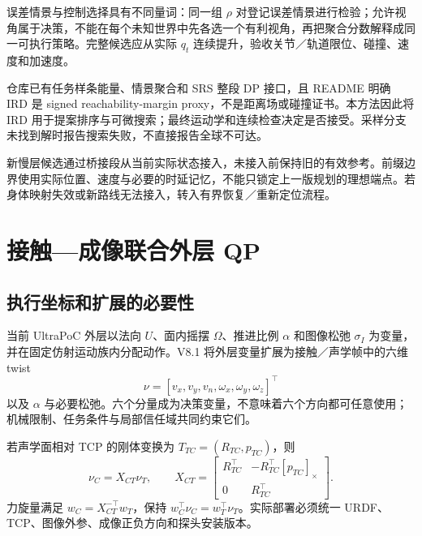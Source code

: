 \documentclass[UTF8,11pt,a4paper,fontset=fandol]{ctexart}
\numberwithin{equation}{section}
\theoremstyle{definition}
\newcommand{\sk}[1]{[#1]_{\times}}
\begin{document}
误差情景与控制选择具有不同量词：同一组 $\rho$ 对登记误差情景进行检验；允许视角属于决策，不能在每个未知世界中先各选一个有利视角，再把聚合分数解释成同一可执行策略。完整候选应从实际 $q_t$ 连续提升，验收关节／轨道限位、碰撞、速度和加速度。

仓库已有任务样条能量、情景聚合和 SRS 整段 DP 接口，且 README 明确 IRD 是 signed reachability-margin proxy，不是距离场或碰撞证书\cite{repoird,reposrs}。本方法因此将 IRD 用于提案排序与可微搜索；最终运动学和连续检查决定是否接受。采样分支未找到解时报告搜索失败，不直接报告全球不可达。

新慢层候选通过桥接段从当前实际状态接入，未接入前保持旧的有效参考。前缀边界使用实际位置、速度与必要的时延记忆，不能只锁定上一版规划的理想端点。若身体映射失效或新路线无法接入，转入有界恢复／重新定位流程。

\section{接触—成像联合外层 QP}
\label{sec:qp}
\subsection{执行坐标和扩展的必要性}
当前 UltraPoC 外层以法向 $U$、面内摇摆 $\Omega$、推进比例 $\alpha$ 和图像松弛 $\sigma_I$ 为变量，并在固定仿射运动族内分配动作\cite{repoouter,repogeom}。V8.1 将外层变量扩展为接触／声学帧中的六维 twist
\begin{equation}
\nu=[v_x,v_y,v_n,\omega_x,\omega_y,\omega_z]^\top
\label{eq:twist}
\end{equation}
以及 $\alpha$ 与必要松弛。六个分量成为决策变量，不意味着六个方向都可任意使用；机械限制、任务条件与局部信任域共同约束它们。

若声学面相对 TCP 的刚体变换为 $T_{TC}=(R_{TC},p_{TC})$，则
\begin{equation}
\nu_C=X_{CT}\nu_T,\qquad
X_{CT}=
\begin{bmatrix}
R_{TC}^{\top}&-R_{TC}^{\top}\sk{p_{TC}}\\
0&R_{TC}^{\top}
\end{bmatrix}.
\label{eq:twisttransform}
\end{equation}
力旋量满足 $w_C=X_{CT}^{-\top}w_T$，保持 $w_C^\top\nu_C=w_T^\top\nu_T$。实际部署必须统一 URDF、TCP、图像外参、成像正负方向和探头安装版本。
\end{document}
